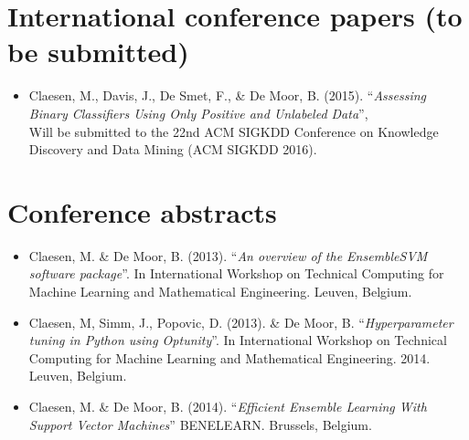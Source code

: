 \section*{International conference papers (to be submitted)}
\begin{itemize}
\item Claesen, M., Davis, J., De Smet, F., \& De Moor, B. (2015). ``\emph{Assessing Binary Classifiers Using Only Positive and Unlabeled Data}'', \\
        Will be submitted to the 22nd ACM SIGKDD Conference on Knowledge Discovery and Data Mining (ACM SIGKDD 2016).
\end{itemize}

\section*{Conference abstracts}
\begin{itemize}
\item Claesen, M. \& De Moor, B. (2013). ``\emph{An overview of the EnsembleSVM software package}''. In International Workshop on Technical Computing for Machine Learning and Mathematical Engineering. Leuven, Belgium.
\item Claesen, M, Simm, J., Popovic, D. (2013). \& De Moor, B. ``\emph{Hyperparameter tuning in Python using Optunity}''. In International Workshop on Technical Computing for Machine Learning and Mathematical Engineering. 2014. Leuven, Belgium.
\item Claesen, M. \& De Moor, B. (2014). ``\emph{Efficient Ensemble Learning With Support Vector Machines}'' BENELEARN. Brussels, Belgium.
\end{itemize}




